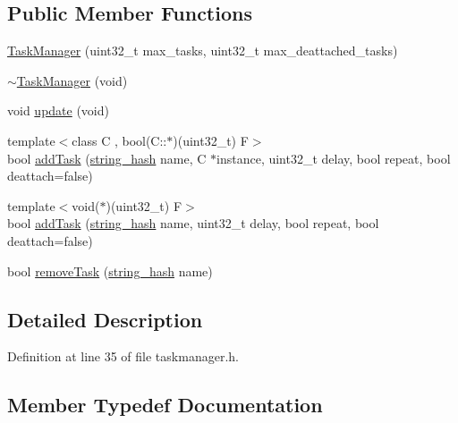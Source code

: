 \subsection*{Public Member Functions}
\begin{DoxyCompactItemize}
\item 
\hyperlink{classcrap_1_1_task_manager_a99693401a50332a865ae99d2c4248fa1}{Task\+Manager} (uint32\+\_\+t max\+\_\+tasks, uint32\+\_\+t max\+\_\+deattached\+\_\+tasks)
\item 
\hyperlink{classcrap_1_1_task_manager_a396840106dda201d2e2d07b273805411}{$\sim$\+Task\+Manager} (void)
\item 
void \hyperlink{classcrap_1_1_task_manager_a60e539f23acdd395d15fad88e0f77d14}{update} (void)
\item 
{\footnotesize template$<$class C , bool(\+C\+::$\ast$)(uint32\+\_\+t) F$>$ }\\bool \hyperlink{classcrap_1_1_task_manager_ac9b51bf76611cea112705785f85bf154}{add\+Task} (\hyperlink{classcrap_1_1string__hash}{string\+\_\+hash} name, C $\ast$instance, uint32\+\_\+t delay, bool repeat, bool deattach=false)
\item 
{\footnotesize template$<$void($\ast$)(uint32\+\_\+t) F$>$ }\\bool \hyperlink{classcrap_1_1_task_manager_aa700349fc95e298a4a994215e055014a}{add\+Task} (\hyperlink{classcrap_1_1string__hash}{string\+\_\+hash} name, uint32\+\_\+t delay, bool repeat, bool deattach=false)
\item 
bool \hyperlink{classcrap_1_1_task_manager_acde7c35ca2b64bf1bc1ef400232c2306}{remove\+Task} (\hyperlink{classcrap_1_1string__hash}{string\+\_\+hash} name)
\end{DoxyCompactItemize}


\subsection{Detailed Description}


Definition at line 35 of file taskmanager.\+h.



\subsection{Member Typedef Documentation}
\hypertarget{classcrap_1_1_task_manager_a4be4696ce3c01594fb82cc142de21e4c}{}
